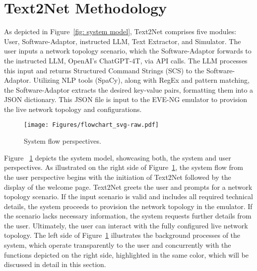 \section{Text2Net Methodology}
As depicted in Figure~\ref{fig: system model}, Text2Net comprises five modules: User, Software-Adaptor, instructed LLM, Text Extractor, and Simulator. The user inputs a network topology scenario, which the Software-Adaptor forwards to the instructed LLM, OpenAI's ChatGPT-4T, via API calls. The LLM processes this input and returns Structured Command Strings (SCS) to the Software-Adaptor. Utilizing NLP tools (SpaCy), along with RegEx and pattern matching, the Software-Adaptor extracts the desired key-value pairs, formatting them into a JSON dictionary. This JSON file is input to the EVE-NG emulator to provision the live network topology and configurations. 

\begin{figure}[ht!]
    \centering
    \texttt{[image: Figures/flowchart\_svg-raw.pdf]}
    \caption{System flow perspectives.}
    \vspace{-3mm}
    \label{fig: flowchart}
    \vspace{-3mm}
\end{figure}

Figure ~\ref{fig: flowchart} depicts the system model, showcasing both, the system and user perspectives.
As illustrated on the right side of Figure~\ref{fig: flowchart}, the system flow from the user perspective begins with the initiation of Text2Net followed by the display of the welcome page. Text2Net greets the user and prompts for a network topology scenario. If the input scenario is valid and includes all required technical details, the system proceeds to provision the network topology in the emulator. If the scenario lacks necessary information, the system requests further details from the user. Ultimately, the user can interact with the fully configured live network topology.
The left side of Figure~\ref{fig: flowchart} illustrates the background processes of the system, which operate transparently to the user and concurrently with the functions depicted on the right side, highlighted in the same color, which will be discussed in detail in this section. 

